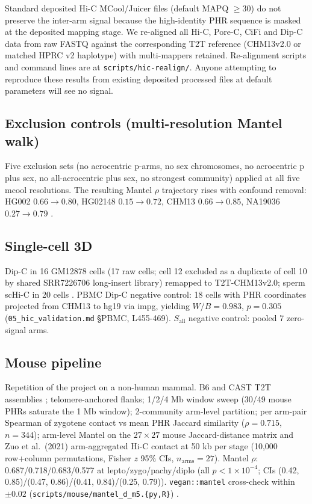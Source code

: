 \documentclass[pdflatex,mathphys]{jnl}
\begin{document}
Standard deposited Hi-C MCool/Juicer files (default MAPQ $\geq 30$) do not
preserve the inter-arm signal because the high-identity PHR sequence is masked
at the deposited mapping stage.
We re-aligned all Hi-C, Pore-C, CiFi and Dip-C data from raw FASTQ against the
corresponding T2T reference (CHM13v2.0 or matched HPRC v2 haplotype) with
multi-mappers retained.
Re-alignment scripts and command lines are at \texttt{scripts/hic-realign/}.
Anyone attempting to reproduce these results from existing deposited processed
files at default parameters will see no signal.

\subsection*{Exclusion controls (multi-resolution Mantel walk)}

Five exclusion sets (no acrocentric p-arms, no sex chromosomes, no acrocentric
p plus sex, no all-acrocentric plus sex, no strongest community) applied at all
five mcool resolutions.
The resulting Mantel $\rho$ trajectory rises with confound removal: HG002
$0.66 \to 0.80$, HG02148 $0.15 \to 0.72$, CHM13 $0.66 \to 0.85$, NA19036
$0.27 \to 0.79$
.

\subsection*{Single-cell 3D}

Dip-C in 16 GM12878 cells  (17 raw cells; cell 12 excluded as
a duplicate of cell 10 by shared SRR7226706 long-insert library) remapped to
T2T-CHM13v2.0; sperm scHi-C in 20 cells
.
PBMC Dip-C negative control: 18 cells with PHR coordinates projected from
CHM13 to hg19 via impg, yielding $W/B = 0.983$, $p = 0.305$
(\texttt{05\_hic\_validation.md} \S PBMC, L455-469).
$S_{\mathrm{all}}$ negative control: pooled 7 zero-signal arms.

\subsection*{Mouse pipeline}

Repetition of the project on a non-human mammal.
B6 and CAST T2T assemblies ; telomere-anchored flanks;
1/2/4 Mb window sweep (30/49 mouse PHRs saturate the 1 Mb window);
2-community arm-level partition; per arm-pair Spearman of zygotene contact vs
mean PHR Jaccard similarity ($\rho = 0.715$, $n = 344$); arm-level Mantel on
the $27 \times 27$ mouse Jaccard-distance matrix and Zuo et al.\ (2021)
arm-aggregated Hi-C contact at 50 kb per stage (10,000 row+column permutations,
Fisher $z$ 95\% CIs, $n_{\mathrm{arms}} = 27$).
Mantel $\rho$: 0.687/0.718/0.683/0.577 at lepto/zygo/pachy/diplo (all
$p < 1 \times 10^{-4}$; CIs
(0.42, 0.85)/(0.47, 0.86)/(0.41, 0.84)/(0.25, 0.79)).
\texttt{vegan::mantel} cross-check within $\pm 0.02$
(\texttt{scripts/mouse/mantel\_d\_m5.\{py,R\}}) .
\end{document}
